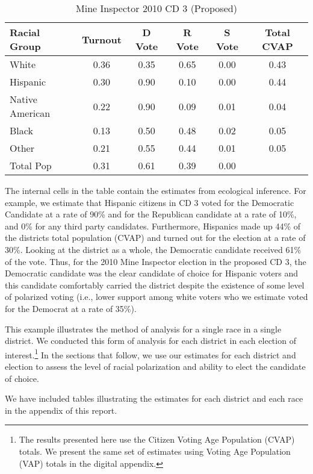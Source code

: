\documentclass[12pt]{scrartcl}
\begin{document}
\begin{table}[ht]
\begin{center}
\caption{Mine Inspector 2010 CD 3 (Proposed)}
\label{smine_cvap_cd_3_ex}
\begin{tabular}{lccccc}
  \hline
Racial Group & Turnout & D Vote & R Vote & S Vote & Total CVAP\\ 
  \hline
White & 0.36 & 0.35 & 0.65 & 0.00 & 0.43 \\ 
  Hispanic & 0.30 & 0.90 & 0.10 & 0.00 & 0.44 \\ 
  Native American & 0.22 & 0.90 & 0.09 & 0.01 & 0.04 \\ 
  Black & 0.13 & 0.50 & 0.48 & 0.02 & 0.05 \\ 
  Other & 0.21 & 0.55 & 0.44 & 0.01 & 0.05 \\ 
  Total Pop & 0.31 & 0.61 & 0.39 & 0.00 &  \\ 
   \hline
\end{tabular}
\end{center}
\end{table}

The internal cells in the table contain the estimates from ecological inference. For example, we estimate that Hispanic citizens in CD 3 voted for the Democratic Candidate at a rate of 90\% and for the Republican candidate at a rate of 10\%, and 0\% for any third party candidates. Furthermore, Hispanics made up 44\% of the districts total population (CVAP) and turned out for the election at a rate of 30\%. Looking at the district as a whole, the Democratic candidate received 61\% of the vote. Thus, for the 2010 Mine Inspector election in the proposed CD 3, the Democratic candidate was the clear candidate of choice for Hispanic voters and this candidate comfortably carried the district despite the existence of some level of polarized voting (i.e., lower support among white voters who we estimate voted for the Democrat at a rate of 35\%). 

This example illustrates the method of analysis for a single race in a single district. We conducted this form of analysis for each district in each election of interest.\footnote{The results presented here use the Citizen Voting Age Population (CVAP) totals. We present the same set of estimates using Voting Age Population (VAP) totals in the digital appendix.} In the sections that follow, we use our estimates for each district and election to assess the level of racial polarization and ability to elect the candidate of choice.

We have included tables illustrating the estimates for each district and each race in the appendix of this report.
\end{document}
